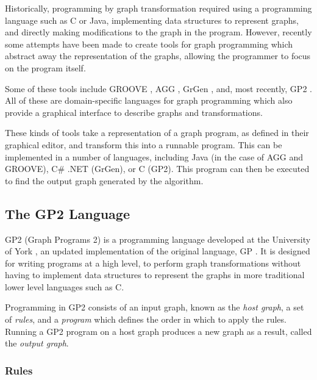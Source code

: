 \documentclass[authoryearcitations]{UoYCSproject}
\begin{document}
Historically, programming by graph transformation required using a programming
language such as C or Java, implementing data structures to represent graphs, and
directly making modifications to the graph in the program. However, recently some
attempts have been made to create tools for graph programming which abstract away
the representation of the graphs, allowing the programmer to focus on the program itself.

Some of these tools include GROOVE \citep{GROOVE2012}, AGG \citep{ermel1999},
GrGen \citep{GrGen2010}, and, most recently, GP2 \citep{plump2012}. All of these
are domain-specific languages for graph programming which also provide a graphical
interface to describe graphs and transformations.

These kinds of tools take a representation of a graph program, as defined in their
graphical editor, and transform this into a runnable program. This can be implemented
in a number of languages, including Java (in the case of AGG and GROOVE), C\# .NET
(GrGen), or C (GP2). This program can then be executed to find the output graph
generated by the algorithm.


\subsection{The GP2 Language}
\label{sec:TheGP2Language}

GP2 (Graph Programs 2) is a programming language developed at the University of
York \citep{plump2012,bak2015}, an updated implementation of the original language,
GP \citep{plump2009}. It is designed for writing programs at a high level, to
perform graph transformations without having to implement data structures to
represent the graphs in more traditional lower level languages such as C.

Programming in GP2 consists of an input graph, known as the \emph{host graph}, a
set of \emph{rules}, and a \emph{program} which defines the order in which to
apply the rules. Running a GP2 program on a host graph produces a new graph as
a result, called the \emph{output graph}.


\subsubsection{Rules}
\label{sec:Rules}
\end{document}
